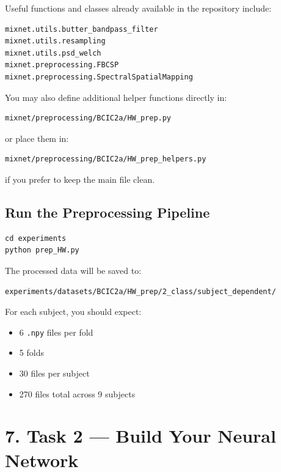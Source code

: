 \documentclass[
  10pt,
]{article}
\begin{document}
Useful functions and classes already available in the repository
include:

\begin{verbatim}
mixnet.utils.butter_bandpass_filter
mixnet.utils.resampling
mixnet.utils.psd_welch
mixnet.preprocessing.FBCSP
mixnet.preprocessing.SpectralSpatialMapping
\end{verbatim}

You may also define additional helper functions directly in:

\begin{verbatim}
mixnet/preprocessing/BCIC2a/HW_prep.py
\end{verbatim}

or place them in:

\begin{verbatim}
mixnet/preprocessing/BCIC2a/HW_prep_helpers.py
\end{verbatim}

if you prefer to keep the main file clean.

\subsection{Run the Preprocessing
Pipeline}\label{run-the-preprocessing-pipeline}

\begin{verbatim}
cd experiments
python prep_HW.py
\end{verbatim}

The processed data will be saved to:

\begin{verbatim}
experiments/datasets/BCIC2a/HW_prep/2_class/subject_dependent/
\end{verbatim}

For each subject, you should expect:

\begin{itemize}
\item
  6 \texttt{.npy} files per fold
\item
  5 folds
\item
  30 files per subject
\item
  270 files total across 9 subjects
\end{itemize}

\section{7. Task 2 --- Build Your Neural
Network}\label{task-2-build-your-neural-network}
\end{document}
